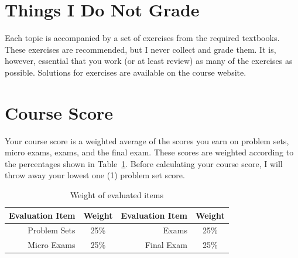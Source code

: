 \documentclass[letterpaper,oneside,onecolumn,11pt,article]{memoir}
\begin{document}
\section{Things I Do Not Grade}
Each topic is accompanied by a set of exercises from the required textbooks. These exercises are recommended, but I never collect and grade them. It is, however, essential that you work (or at least review) as many of the exercises as possible. Solutions for exercises are available on the course website. 
%
%
\section{Course Score}
Your course score is a weighted average of the scores you earn on problem sets, micro exams, exams, and the final exam. These scores are weighted according to the percentages shown in Table~\ref{tab:weights}. Before calculating your course score, I will throw away your lowest one (1) problem set score. 
%
%
\renewcommand{\arraystretch}{1.15}
\begin{table}[h]
\caption{\sffamily Weight of evaluated items}
\label{tab:weights}
\begin{tabular}{rc|rc}
\hline\hline
\textbf{Evaluation Item} & \textbf{Weight} & \textbf{Evaluation Item} & \textbf{Weight} \\ \hline
Problem Sets & 25\% & Exams & 25\% \\
Micro Exams & 25\% & Final Exam & 25\% \\
\hline\hline
\end{tabular}
\end{table}
%
%
\end{document}

